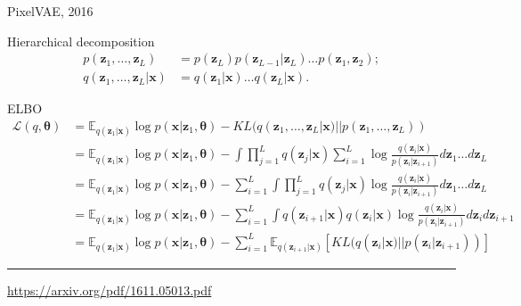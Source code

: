 \documentclass{beamer}
\newcommand{\bx}{\mathbf{x}}
\newcommand{\bz}{\mathbf{z}}
\newcommand{\btheta}{\boldsymbol{\theta}}
\begin{document}
\begin{frame}{PixelVAE, 2016}
	\begin{block}{Hierarchical decomposition}
		\vspace{-1cm}
		\begin{align*}
			p(\bz_1, \dots, \bz_L) &= p(\bz_L) p(\bz_{L-1} | \bz_L) \dots p(\bz_1, \bz_2); \\
			q(\bz_1, \dots, \bz_L | \bx) &= q(\bz_1 | \bx) \dots q(\bz_L | \bx).
		\end{align*}
	\end{block}
	\vspace{-0.5cm}
	\begin{block}{ELBO}
		\vspace{-0.5cm}
		{\footnotesize
			\begin{align*}
				\mathcal{L}(q, \btheta) &= \mathbb{E}_{q(\bz_1 | \bx)} \log p(\bx | \bz_1, \btheta) - KL(q(\bz_1, \dots, \bz_L | \bx) || p(\bz_1, \dots, \bz_L)) \\
				&= \mathbb{E}_{q(\bz_1 | \bx)} \log p(\bx | \bz_1, \btheta) - \int \prod_{j=1}^L q(\bz_j | \bx) \sum_{i=1}^L \log \frac{q(\bz_i | \bx)}{p(\bz_i | \bz_{i + 1})} d \bz_1 \dots d \bz_L \\
				&= \mathbb{E}_{q(\bz_1 | \bx)} \log p(\bx | \bz_1, \btheta) - \sum_{i=1}^L \int \prod_{j=1}^L q(\bz_j | \bx) \log \frac{q(\bz_i | \bx)}{p(\bz_i | \bz_{i + 1})} d \bz_1 \dots d \bz_L \\
				&= \mathbb{E}_{q(\bz_1 | \bx)} \log p(\bx | \bz_1, \btheta) - \sum_{i=1}^L \int q(\bz_{i+1} | \bx) q(\bz_i | \bx) \log \frac{q(\bz_i | \bx)}{p(\bz_i | \bz_{i + 1})} d \bz_i d \bz_{i+1} \\
				&= \mathbb{E}_{q(\bz_1 | \bx)} \log p(\bx | \bz_1, \btheta) - \sum_{i=1}^L \mathbb{E}_{q(\bz_{i+1} | \bx)} \left[ KL (q(\bz_i | \bx) || p(\bz_i | \bz_{i + 1}))\right]
			\end{align*}
		}
	\end{block}
	\vfill
	\hrule\medskip
	{\scriptsize \href{https://arxiv.org/pdf/1611.05013.pdf}{https://arxiv.org/pdf/1611.05013.pdf}}
\end{frame}
\end{document}
